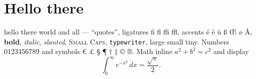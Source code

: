 \documentclass{article}
\begin{document}
\section{Hello there}
hello there world and all --- ``quotes'', ligatures fi fl ffi ffl, accents é è ü ß Œ ø Å,
\textbf{bold}, \textit{italic}, \textsl{slanted}, \textsc{Small Caps}, \texttt{typewriter},
{\large large} {\small small} {\tiny tiny}. Numbers 0123456789 and symbols € £ § ¶ † ‡ © ®.
Math inline $a^2+b^2=c^2$ and display
\[ \int_0^\infty e^{-x^2}\,dx = \frac{\sqrt\pi}{2}. \]
\end{document}

